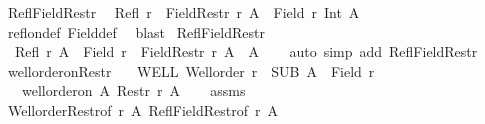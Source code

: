 \begin{isabellebody}
\endisatagproof
{\isafoldproof}%
%
\isadelimproof
\isanewline
%
\endisadelimproof
\isanewline
{}\isamarkupfalse%
\ Refl{\isacharunderscore}{\kern0pt}Field{\isacharunderscore}{\kern0pt}Restr{\isacharcolon}{\kern0pt}\isanewline
\ \ {\isachardoublequoteopen}Refl\ r\ {\isasymLongrightarrow}\ Field{\isacharparenleft}{\kern0pt}Restr\ r\ A{\isacharparenright}{\kern0pt}\ {\isacharequal}{\kern0pt}\ {\isacharparenleft}{\kern0pt}Field\ r{\isacharparenright}{\kern0pt}\ Int\ A{\isachardoublequoteclose}\isanewline
%
\isadelimproof
\ \ %
\endisadelimproof
%
\isatagproof
{}\isamarkupfalse%
\ refl{\isacharunderscore}{\kern0pt}on{\isacharunderscore}{\kern0pt}def\ Field{\isacharunderscore}{\kern0pt}def\ \isamarkupfalse%
\ blast%
\endisatagproof
{\isafoldproof}%
%
\isadelimproof
\isanewline
%
\endisadelimproof
\isanewline
{}\isamarkupfalse%
\ Refl{\isacharunderscore}{\kern0pt}Field{\isacharunderscore}{\kern0pt}Restr{}{\isacharcolon}{\kern0pt}\isanewline
\ \ {\isachardoublequoteopen}{\isasymlbrakk}Refl\ r{\isacharsemicolon}{\kern0pt}\ A\ {\isasymle}\ Field\ r{\isasymrbrakk}\ {\isasymLongrightarrow}\ Field{\isacharparenleft}{\kern0pt}Restr\ r\ A{\isacharparenright}{\kern0pt}\ {\isacharequal}{\kern0pt}\ A{\isachardoublequoteclose}\isanewline
%
\isadelimproof
\ \ %
\endisadelimproof
%
\isatagproof
{}\isamarkupfalse%
\ {\isacharparenleft}{\kern0pt}auto\ simp\ add{\isacharcolon}{\kern0pt}\ Refl{\isacharunderscore}{\kern0pt}Field{\isacharunderscore}{\kern0pt}Restr{\isacharparenright}{\kern0pt}%
\endisatagproof
{\isafoldproof}%
%
\isadelimproof
\isanewline
%
\endisadelimproof
\isanewline
{}\isamarkupfalse%
\ well{\isacharunderscore}{\kern0pt}order{\isacharunderscore}{\kern0pt}on{\isacharunderscore}{\kern0pt}Restr{\isacharcolon}{\kern0pt}\isanewline
\ \ \ WELL{\isacharcolon}{\kern0pt}\ {\isachardoublequoteopen}Well{\isacharunderscore}{\kern0pt}order\ r{\isachardoublequoteclose}\ \ SUB{\isacharcolon}{\kern0pt}\ {\isachardoublequoteopen}A\ {\isasymle}\ Field\ r{\isachardoublequoteclose}\isanewline
\ \ \ {\isachardoublequoteopen}well{\isacharunderscore}{\kern0pt}order{\isacharunderscore}{\kern0pt}on\ A\ {\isacharparenleft}{\kern0pt}Restr\ r\ A{\isacharparenright}{\kern0pt}{\isachardoublequoteclose}\isanewline
%
\isadelimproof
\ \ %
\endisadelimproof
%
\isatagproof
{}\isamarkupfalse%
\ assms\isanewline
\ \ \isamarkupfalse%
\ Well{\isacharunderscore}{\kern0pt}order{\isacharunderscore}{\kern0pt}Restr{\isacharbrackleft}{\kern0pt}of\ r\ A{\isacharbrackright}{\kern0pt}\ Refl{\isacharunderscore}{\kern0pt}Field{\isacharunderscore}{\kern0pt}Restr{}{\isacharbrackleft}{\kern0pt}of\ r\ A{\isacharbrackright}{\kern0pt}\isanewline

\end{isabellebody}
